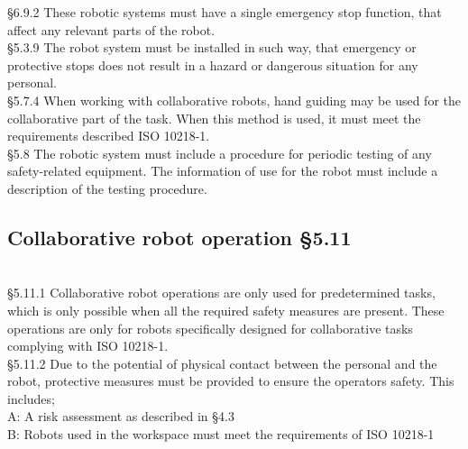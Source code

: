\S6.9.2 These robotic systems must have a single emergency stop function, that affect any relevant parts of the robot.\\

\S5.3.9 The robot system must be installed in such way, that emergency or protective stops does not result in a hazard or dangerous situation for any personal.\\

\S5.7.4 When working with collaborative robots, hand guiding may be used for the collaborative part of the task. When this method is used, it must meet the requirements described ISO 10218-1. \\

\S5.8 The robotic system must include a procedure for periodic testing of any safety-related equipment. The information of use for the robot must include a description of the testing procedure. \\

\subsection{Collaborative robot operation \S5.11}
\\
\S5.11.1 Collaborative robot operations are only used for predetermined tasks, which is only possible when all the required safety measures are present. These operations are only for robots specifically designed for collaborative tasks complying with ISO 10218-1. \\

\S5.11.2 Due to the potential of physical contact between the personal and the robot, protective measures must be provided to ensure the operators safety. This includes; \\
A: A risk assessment as described in \S4.3\\
B: Robots used in the workspace must meet the requirements of ISO 10218-1 \\
\cite{dspart2}



